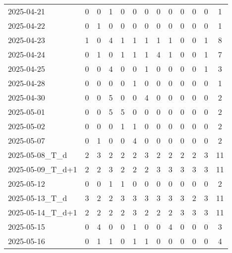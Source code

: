 \documentclass[dvipdfmx,oneside]{article}
\begin{document}
\begin{longtable}{lcccccccccccc}
        2025-04-21 &     0 &     0 &     1 &     0 &     0 &     0 &     0 &     0 &     0 &     0 &     0 &      1 \\
        2025-04-22 &     0 &     1 &     0 &     0 &     0 &     0 &     0 &     0 &     0 &     0 &     0 &      1 \\
        2025-04-23 &     1 &     0 &     4 &     1 &     1 &     1 &     1 &     1 &     0 &     0 &     1 &      8 \\
        2025-04-24 &     0 &     1 &     0 &     1 &     1 &     1 &     4 &     1 &     0 &     0 &     1 &      7 \\
        2025-04-25 &     0 &     0 &     4 &     0 &     0 &     1 &     0 &     0 &     0 &     0 &     1 &      3 \\
        2025-04-28 &     0 &     0 &     0 &     0 &     1 &     0 &     0 &     0 &     0 &     0 &     0 &      1 \\
        2025-04-30 &     0 &     0 &     5 &     0 &     0 &     4 &     0 &     0 &     0 &     0 &     0 &      2 \\
        2025-05-01 &     0 &     0 &     5 &     5 &     0 &     0 &     0 &     0 &     0 &     0 &     0 &      2 \\
        2025-05-02 &     0 &     0 &     0 &     1 &     1 &     0 &     0 &     0 &     0 &     0 &     0 &      2 \\
        2025-05-07 &     0 &     1 &     0 &     0 &     4 &     0 &     0 &     0 &     0 &     0 &     0 &      2 \\
  2025-05-08\_T\_d &     2 &     3 &     2 &     2 &     2 &     3 &     2 &     2 &     2 &     2 &     3 &     11 \\
2025-05-09\_T\_d+1 &     2 &     2 &     3 &     2 &     2 &     2 &     3 &     3 &     3 &     3 &     3 &     11 \\
        2025-05-12 &     0 &     0 &     1 &     1 &     0 &     0 &     0 &     0 &     0 &     0 &     0 &      2 \\
  2025-05-13\_T\_d &     3 &     2 &     2 &     3 &     3 &     3 &     3 &     3 &     3 &     2 &     3 &     11 \\
2025-05-14\_T\_d+1 &     2 &     2 &     2 &     2 &     3 &     2 &     2 &     2 &     3 &     3 &     3 &     11 \\
        2025-05-15 &     0 &     4 &     0 &     0 &     1 &     0 &     0 &     4 &     0 &     0 &     0 &      3 \\
        2025-05-16 &     0 &     1 &     1 &     0 &     1 &     1 &     0 &     0 &     0 &     0 &     0 &      4 \\

\end{longtable}
\end{document}
